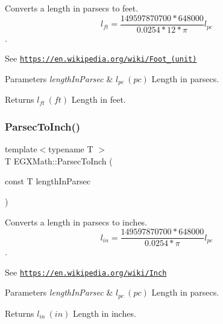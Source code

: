 Converts a length in parsecs to feet. \[ l_{ft}= \frac{149597870700 * 648000}{0.0254 * 12 * \pi} l_{pc} \]. 

See \href{https://en.wikipedia.org/wiki/Foot_(unit)}{\tt https\+://en.\+wikipedia.\+org/wiki/\+Foot\+\_\+(unit)} 
\begin{DoxyParams}{Parameters}
{\em length\+In\+Parsec} & $ l_{pc}\ (pc)$ Length in parsecs. \\
\hline
\end{DoxyParams}
\begin{DoxyReturn}{Returns}
$ l_{ft}\ (ft)$ Length in feet. 
\end{DoxyReturn}
\mbox{\label{group___e_g_x_math-_conversions-_length_conversions-_astronomical-_parsec-_imperial_gaebc7c4ce22fe7ae0ae26420284598c29}} 
\subsubsection{\texorpdfstring{Parsec\+To\+Inch()}{ParsecToInch()}}
{\footnotesize\ttfamily template$<$typename T $>$ \\
T E\+G\+X\+Math\+::\+Parsec\+To\+Inch (\begin{DoxyParamCaption}\item[{const T}]{length\+In\+Parsec }\end{DoxyParamCaption})}



Converts a length in parsecs to inches. \[ l_{in}= \frac{149597870700 * 648000}{0.0254 * \pi} l_{pc} \]. 

See \href{https://en.wikipedia.org/wiki/Inch}{\tt https\+://en.\+wikipedia.\+org/wiki/\+Inch} 
\begin{DoxyParams}{Parameters}
{\em length\+In\+Parsec} & $ l_{pc}\ (pc)$ Length in parsecs. \\
\hline
\end{DoxyParams}
\begin{DoxyReturn}{Returns}
$ l_{in}\ (in)$ Length in inches. 
\end{DoxyReturn}
\mbox{\label{group___e_g_x_math-_conversions-_length_conversions-_astronomical-_parsec-_imperial_ga7ff283e88a975e05bd987930e8b3cbf2}} 
